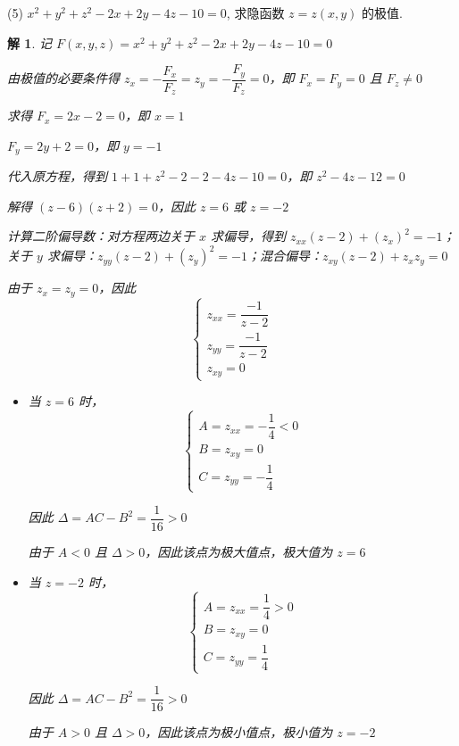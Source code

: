 \documentclass[a4paper,12pt]{article}
\newtheorem*{sol}{解}
\begin{document}
(5) $x^2 + y^2 + z^2 - 2x + 2y - 4z - 10 = 0$, 求隐函数 $z = z(x,y)$ 的极值.
\begin{sol}
    记 $F(x,y,z)=x^2 + y^2 + z^2 - 2x + 2y - 4z - 10 = 0$

    由极值的必要条件得 $z_x=-\dfrac{F_x}{F_z}=z_y=-\dfrac{F_y}{F_z}=0$，即 $F_x=F_y=0$ 且 $F_z\neq 0$

    求得 $F_x = 2x - 2 = 0$，即 $x = 1$

    $F_y = 2y + 2 = 0$，即 $y = -1$

    代入原方程，得到 $1 + 1 + z^2 - 2 - 2 - 4z - 10 = 0$，即 $z^2 - 4z - 12 = 0$

    解得 $(z-6)(z+2) = 0$，因此 $z=6$ 或 $z=-2$

    计算二阶偏导数：对方程两边关于 $x$ 求偏导，得到 $z_{xx}(z-2) + (z_x)^2 = -1$；关于 $y$ 求偏导：$z_{yy}(z-2) + (z_y)^2 = -1$；混合偏导：$z_{xy}(z-2) + z_x z_y = 0$

    由于 $z_x=z_y=0$，因此
    $$
        \begin{cases}
            z_{xx} = \dfrac{-1}{z-2} \\
            z_{yy} = \dfrac{-1}{z-2} \\
            z_{xy} = 0
        \end{cases}
    $$

    \begin{itemize}
        \item 当 $z=6$ 时，
              $$
                  \begin{cases}
                      A = z_{xx} = -\dfrac{1}{4}<0 \\
                      B = z_{xy} = 0               \\
                      C = z_{yy} = -\dfrac{1}{4}
                  \end{cases}
              $$

              因此 $\Delta = AC - B^2 = \dfrac{1}{16} > 0$

              由于 $A<0$ 且 $\Delta>0$，因此该点为极大值点，极大值为 $z=6$

        \item 当 $z=-2$ 时，
              $$
                  \begin{cases}
                      A = z_{xx} = \dfrac{1}{4}>0 \\
                      B = z_{xy} = 0              \\
                      C = z_{yy} = \dfrac{1}{4}
                  \end{cases}
              $$

              因此 $\Delta = AC - B^2 = \dfrac{1}{16} > 0$

              由于 $A>0$ 且 $\Delta>0$，因此该点为极小值点，极小值为 $z=-2$
    \end{itemize}
\end{sol}
\end{document}

